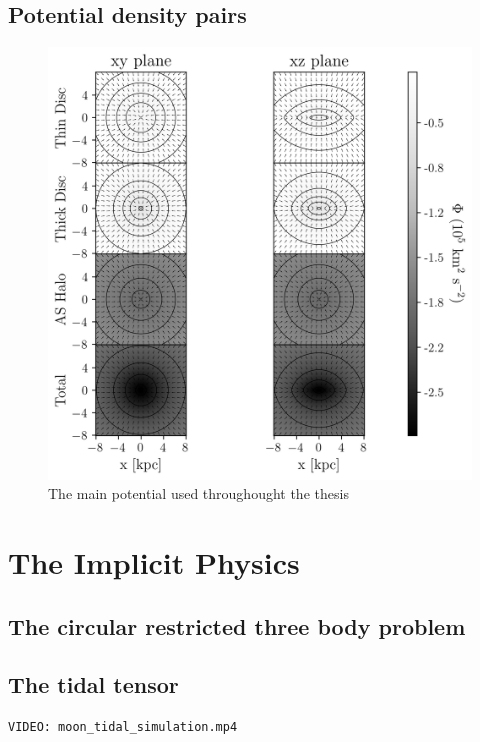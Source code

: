     \subsection{Potential density pairs}

        \begin{figure}
            \centering
            \includegraphics[width=\linewidth]{images/figure_pouliasis2017pii_potential_-8_8.png}
            \caption{The main potential used throughought the thesis}
        \end{figure}        
    

\section{The Implicit Physics}

    \subsection{The circular restricted three body problem}

    \subsection{The tidal tensor}
        
\begin{verbatim}
VIDEO: moon_tidal_simulation.mp4
\end{verbatim}

